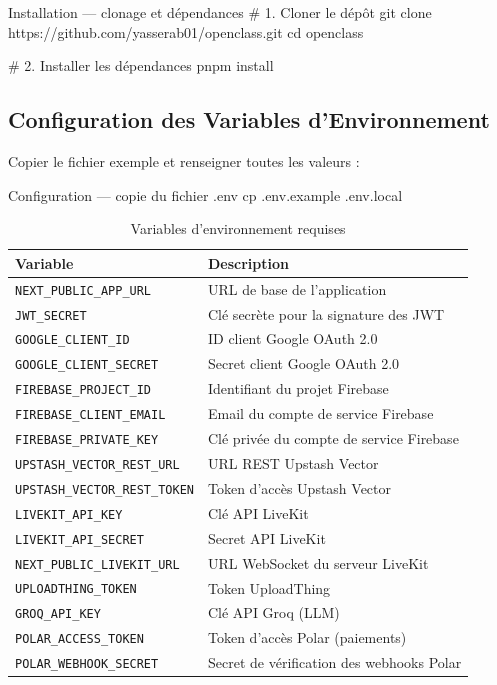 \documentclass[12pt, a4paper, twoside]{report}
\begin{document}
\begin{codesnap}[bash]{Installation — clonage et dépendances}
# 1. Cloner le dépôt
git clone https://github.com/yasserab01/openclass.git
cd openclass

# 2. Installer les dépendances
pnpm install
\end{codesnap}

\subsection{Configuration des Variables d'Environnement}

Copier le fichier exemple et renseigner toutes les valeurs :

\begin{codesnap}[bash]{Configuration — copie du fichier .env}
cp .env.example .env.local
\end{codesnap}

\begin{table}[H]
  \begin{tabularx}{\textwidth}{|l|X|}
    \hline
    \textbf{Variable} & \textbf{Description} \\
    \hline
    \texttt{NEXT\_PUBLIC\_APP\_URL}      & URL de base de l'application \\
    \texttt{JWT\_SECRET}                 & Clé secrète pour la signature des JWT \\
    \texttt{GOOGLE\_CLIENT\_ID}          & ID client Google OAuth 2.0 \\
    \texttt{GOOGLE\_CLIENT\_SECRET}      & Secret client Google OAuth 2.0 \\
    \texttt{FIREBASE\_PROJECT\_ID}       & Identifiant du projet Firebase \\
    \texttt{FIREBASE\_CLIENT\_EMAIL}     & Email du compte de service Firebase \\
    \texttt{FIREBASE\_PRIVATE\_KEY}      & Clé privée du compte de service Firebase \\
    \texttt{UPSTASH\_VECTOR\_REST\_URL}  & URL REST Upstash Vector \\
    \texttt{UPSTASH\_VECTOR\_REST\_TOKEN}& Token d'accès Upstash Vector \\
    \texttt{LIVEKIT\_API\_KEY}           & Clé API LiveKit \\
    \texttt{LIVEKIT\_API\_SECRET}        & Secret API LiveKit \\
    \texttt{NEXT\_PUBLIC\_LIVEKIT\_URL}  & URL WebSocket du serveur LiveKit \\
    \texttt{UPLOADTHING\_TOKEN}          & Token UploadThing \\
    \texttt{GROQ\_API\_KEY}              & Clé API Groq (LLM) \\
    \texttt{POLAR\_ACCESS\_TOKEN}        & Token d'accès Polar (paiements) \\
    \texttt{POLAR\_WEBHOOK\_SECRET}      & Secret de vérification des webhooks Polar \\
    \hline
  \end{tabularx}
  \caption{Variables d'environnement requises}
  \label{tab:envvars}
\end{table}
\end{document}
